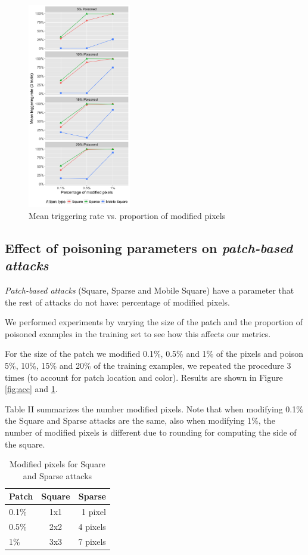 \documentclass[letterpaper, 10 pt, conference]{ieeeconf}  %
\begin{document}
\begin{figure}[h]
\centering
\includegraphics[width=0.4\textwidth]{mean_rate.png}
\caption{Mean triggering rate vs. proportion of modified pixels}
\label{fig:rate}
\end{figure}


\subsection{Effect of poisoning parameters on \textit{patch-based attacks}}

\textit{Patch-based attacks} (Square, Sparse and Mobile Square) have a
parameter that the rest of attacks do not have: percentage of modified pixels.

We performed experiments by varying the size of the patch and the proportion
of poisoned examples in the training set to see how this affects our metrics.

For the size of the patch we modified 0.1\%, 0.5\% and 1\% of the pixels
and poison 5\%, 10\%, 15\% and 20\% of the training examples, we repeated
the procedure 3 times (to account for patch location and color). Results are
shown in Figure \ref{fig:acc} and \ref{fig:rate}.

Table II summarizes the number modified pixels. Note that when
modifying 0.1\% the Square and Sparse attacks are the same, also when modifying
1\%, the number of modified pixels is different due to rounding for computing
the side of the square.

\begin{table}
  \begin{center}
  \begin{tabular}{lcr}
    \hline
    Patch & Square & Sparse\\
    \hline
    0.1\% & 1x1 & 1 pixel \\
    0.5\% & 2x2 & 4 pixels\\
    1\% & 3x3 & 7 pixels \\
    \hline
  \end{tabular}
  \caption{Modified pixels for Square and Sparse attacks}
  \end{center}
\end{table}
\end{document}
